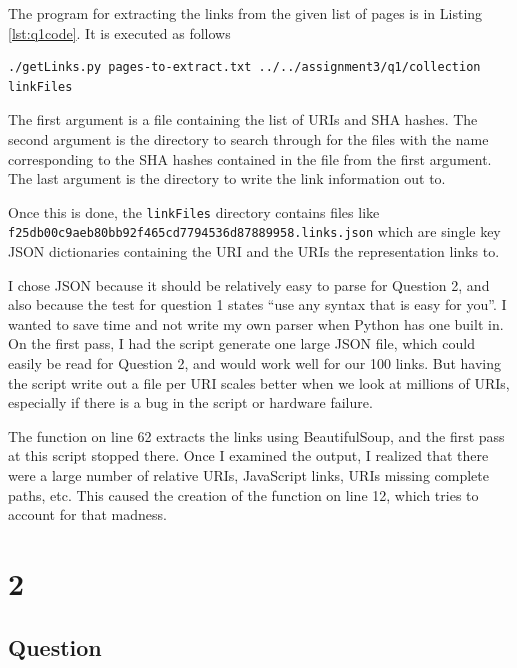 \documentclass[letterpaper,11pt]{article}
\begin{document}
The program for extracting the links from the given list of pages is in Listing \ref{lst:q1code}.  It is executed as follows
\begin{lstlisting}[frame=single,basicstyle=\tiny]
./getLinks.py pages-to-extract.txt ../../assignment3/q1/collection linkFiles
\end{lstlisting}

The first argument is a file containing the list of URIs and SHA hashes.  The second argument is the directory to search through for the files with the name corresponding to the SHA hashes contained in the file from the first argument.  The last argument is the directory to write the link information out to.

Once this is done, the \verb+linkFiles+ directory contains files like \newline \verb+f25db00c9aeb80bb92f465cd7794536d87889958.links.json+ which are single key JSON dictionaries containing the URI and the URIs the representation links to.

I chose JSON because it should be relatively easy to parse for Question 2, and also because the test for question 1 states ``use any syntax that is easy for you''.  I wanted to save time and not write my own parser when Python has one built in.  On the first pass, I had the script generate one large JSON file, which could easily be read for Question 2, and would work well for our 100 links.  But having the script write out a file per URI scales better when we look at millions of URIs, especially if there is a bug in the script or hardware failure.

The function on line 62 extracts the links using BeautifulSoup, and the first pass at this script stopped there.  Once I examined the output, I realized that there were a large number of relative URIs, JavaScript links, URIs missing complete paths, etc.  This caused the creation of the function on line 12, which tries to account for that madness.



\newpage


\newpage
\section*{2}

\subsection*{Question}
\end{document}
